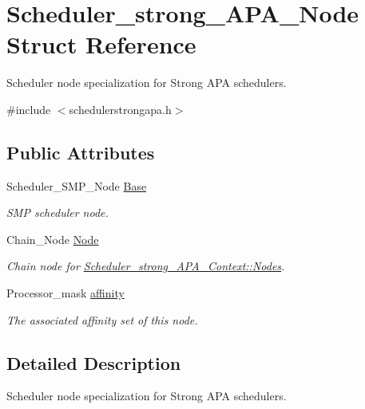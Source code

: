 \hypertarget{structScheduler__strong__APA__Node}{}\section{Scheduler\+\_\+strong\+\_\+\+A\+P\+A\+\_\+\+Node Struct Reference}
\label{structScheduler__strong__APA__Node}


Scheduler node specialization for Strong A\+PA schedulers.  




{\ttfamily \#include $<$schedulerstrongapa.\+h$>$}

\subsection*{Public Attributes}
\begin{DoxyCompactItemize}
\item 
Scheduler\+\_\+\+S\+M\+P\+\_\+\+Node \hyperlink{structScheduler__strong__APA__Node_ae86cbf5fd8743267abe33bed6d8b0fe6}{Base}
\begin{DoxyCompactList}\small\item\em S\+MP scheduler node. \end{DoxyCompactList}\item 
Chain\+\_\+\+Node \hyperlink{structScheduler__strong__APA__Node_aed93ad80a3757ffbbe0a0d1b5426b3cc}{Node}
\begin{DoxyCompactList}\small\item\em Chain node for \hyperlink{structScheduler__strong__APA__Context_a07cebd5016654b5c7d05ec9982449d4d}{Scheduler\+\_\+strong\+\_\+\+A\+P\+A\+\_\+\+Context\+::\+Nodes}. \end{DoxyCompactList}\item 
Processor\+\_\+mask \hyperlink{structScheduler__strong__APA__Node_a2e8928b11f1738a11c228780eb849989}{affinity}
\begin{DoxyCompactList}\small\item\em The associated affinity set of this node. \end{DoxyCompactList}\end{DoxyCompactItemize}


\subsection{Detailed Description}
Scheduler node specialization for Strong A\+PA schedulers. 

